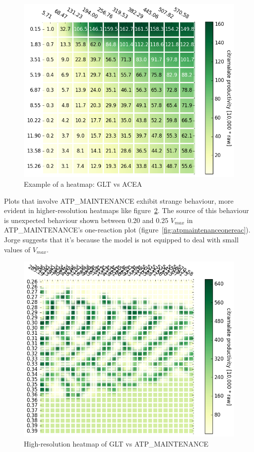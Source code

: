 \documentclass[parskip=full]{scrreprt}
\begin{document}
\begin{figure}[htbp]
  \centering
  \includegraphics[scale=0.5]{heatmapsample}
  \caption{Example of a heatmap: GLT vs ACEA}
  \label{fig:heatmapsample}
\end{figure}

Plots that involve ATP\_MAINTENANCE exhibit strange behaviour, more evident in higher-resolution heatmaps like figure~\ref{fig:atpmaintenanceheatmap}. The source of this behaviour is unexpected behaviour shown between 0.20 and 0.25 $V_{max}$ in ATP\_MAINTENANCE's one-reaction plot (figure~\ref{fig:atpmaintenanceonereac}). Jorge suggests that it’s because the model is not equipped to deal with small values of $V_{max}$.

\begin{figure}[htbp]
  \centering
  \includegraphics[scale=0.5]{atpmaintenanceheatmap}
  \caption{High-resolution heatmap of GLT vs ATP\_MAINTENANCE}
  \label{fig:atpmaintenanceheatmap}
\end{figure}
\end{document}
